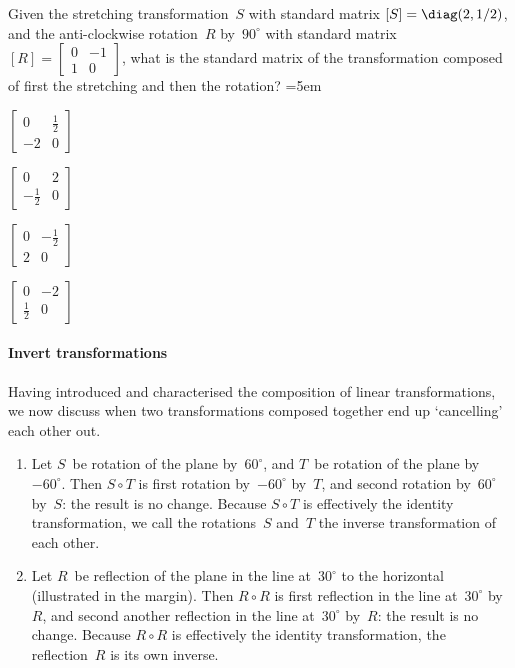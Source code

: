 \begin{activity}
Given the stretching transformation~\(S\) with standard matrix \([S]=\diag(2,1/2)\), and the anti-clockwise rotation~\(R\) by~\(90^\circ\) with standard matrix \([R]=\begin{bmatrix} 0&-1\\1&0 \end{bmatrix}\), what is the standard matrix of the transformation composed of first the stretching and then the rotation?
\partswidth=5em
\begin{parts}
\item \(\begin{bmatrix} 0&\tfrac12\\-2&0 \end{bmatrix}\)
\item \(\begin{bmatrix} 0&2\\-\tfrac12&0 \end{bmatrix}\)
\item \(\begin{bmatrix} 0&-\tfrac12\\2&0 \end{bmatrix}\)
\item \(\begin{bmatrix} 0&-2\\\tfrac12&0 \end{bmatrix}\)
\end{parts}
\end{activity}




\paragraph{Invert transformations}
Having introduced and characterised the composition of linear transformations, we now discuss when two transformations composed together end up `cancelling' each other out.

\begin{example} \label{eg:}
\begin{enumerate}
\item Let \(S\)~be rotation of the plane by~\(60^\circ\), and \(T\)~be rotation of the plane by~\(-60^\circ\).
Then \(S\circ T\) is first rotation by~\(-60^\circ\) by~\(T\), and second rotation by~\(60^\circ\) by~\(S\): the result is no change.
Because \(S\circ T\) is effectively the identity transformation, we call the rotations~\(S\) and~\(T\) the inverse transformation of each other.

\item Let \(R\)~be reflection of the plane in the line at~\(30^\circ\) to the horizontal (illustrated in the margin).  
%
Then \(R\circ R\) is first reflection in the line at~\(30^\circ\) by~\(R\), and second another reflection in the line at~\(30^\circ\) by~\(R\): the result is no change.
Because \(R\circ R\) is effectively the identity transformation, the reflection~\(R\) is its own inverse.
\end{enumerate}
\end{example}



